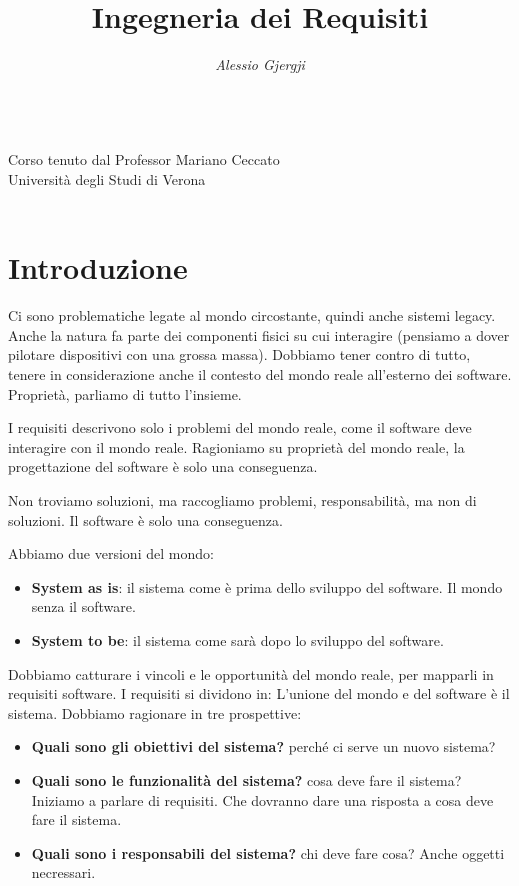 \documentclass[oneside,a4paper,11pt]{book}
\title{Ingegneria dei Requisiti}
\author{\textit{Alessio Gjergji}}
\date{}
\theoremstyle{italicstyle}
\theoremstyle{normStyle}
\begin{document}
\begin{titlingpage}
  \centering
  \huge
  \textbf{\thetitle}\\[0.5cm]
  \normalsize
  Corso tenuto dal Professor Mariano Ceccato\\[0.5cm]
  Università degli Studi di Verona\\[1cm]
  \large
  \theauthor\\[0.5cm]
\end{titlingpage}
\tableofcontents
\chapter{Introduzione}
Ci sono problematiche legate al mondo circostante, quindi anche 
sistemi legacy. Anche la natura fa parte dei componenti fisici su 
cui interagire (pensiamo a dover pilotare dispositivi con una grossa massa).
Dobbiamo tener contro di tutto, tenere in considerazione anche il contesto 
del mondo reale all'esterno dei software. Proprietà, parliamo di tutto l'insieme.

I requisiti descrivono solo i problemi del mondo reale, come il software deve 
interagire con il mondo reale. Ragioniamo su proprietà del mondo reale,
la progettazione del software è solo una conseguenza.

Non troviamo soluzioni, ma raccogliamo problemi, responsabilità, ma 
non di soluzioni. Il software è solo una conseguenza.

Abbiamo due versioni del mondo:
\begin{itemize}
    \item \textbf{System as is}: il sistema come è prima dello sviluppo
    del software. Il mondo senza il software.
    \item \textbf{System to be}: il sistema come sarà dopo lo sviluppo
    del software.
\end{itemize}
Dobbiamo catturare i vincoli e le opportunità del mondo reale,
per mapparli in requisiti software.
I requisiti si dividono in:
L'unione del mondo e del software è il sistema.
Dobbiamo ragionare in tre prospettive:
\begin{itemize}
    \item \textbf{Quali sono gli obiettivi del sistema?} perché ci serve un nuovo 
    sistema?
    \item \textbf{Quali sono le funzionalità del sistema?} cosa deve
    fare il sistema? Iniziamo a parlare di requisiti. Che dovranno dare una 
    risposta a cosa deve fare il sistema.
    \item \textbf{Quali sono i responsabili del sistema?} chi deve fare cosa? Anche 
    oggetti necressari.
\end{itemize}
\end{document}
